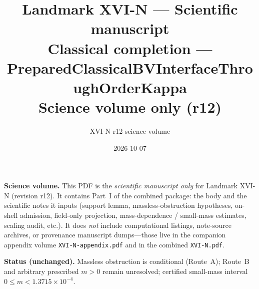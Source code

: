 \documentclass{article}
\title{Landmark XVI-N --- Scientific manuscript\\
\large Classical completion --- PreparedClassicalBVInterfaceThroughOrderKappa\\
\large Science volume only (r12)}
\author{XVI-N r12 science volume}
\date{2026-10-07}
\begin{document}
\maketitle
\noindent\textbf{Science volume.}
This PDF is the \emph{scientific manuscript only} for Landmark XVI-N (revision r12).
It contains Part~I of the combined package: the body and the scientific notes it
inputs (support lemma, massless-obstruction hypotheses, on-shell admission,
field-only projection, mass-dependence / small-mass estimates, scaling audit, etc.).
It does \emph{not} include computational listings, note-source archives, or provenance
manuscript dumps---those live in the companion appendix volume
\texttt{XVI-N-appendix.pdf} and in the combined \texttt{XVI-N.pdf}.

\noindent\textbf{Status (unchanged).}
Massless obstruction is conditional (Route~A); Route~B and arbitrary prescribed $m>0$
remain unresolved; certified small-mass interval $0\le m<1.3715\times10^{-4}$.

\tableofcontents
\newpage
\let\tableofcontents\relax


\end{document}

